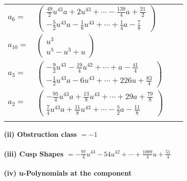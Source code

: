 \documentclass[1p]{elsarticle_modified}
\theoremstyle{definition}
\begin{document}
\begin{tabular}{m{7pt} m{180pt} m{7pt} m{180pt} }
\flushright $a_{6}=$&$\begin{pmatrix}\frac{49}{2} u^{43} a+2 u^{43}+\cdots-\frac{139}{4} a+\frac{21}{2}\\-\frac{5}{2} u^{43} a-\frac{1}{8} u^{43}+\cdots+\frac{1}{4} a-\frac{7}{8}\end{pmatrix}$ \\
\flushright $a_{10}=$&$\begin{pmatrix}u^3\\u^5- u^3+u\end{pmatrix}$ \\
\flushright $a_{3}=$&$\begin{pmatrix}-\frac{9}{2} u^{43}-\frac{19}{4} u^{42}+\cdots+a-\frac{41}{4}\\-\frac{1}{2} u^{43} a-6 u^{43}+\cdots+226 u+\frac{83}{4}\end{pmatrix}$ \\
\flushright $a_{2}=$&$\begin{pmatrix}-\frac{95}{4} u^{43} a+\frac{13}{8} u^{43}+\cdots+29 a+\frac{79}{8}\\\frac{7}{4} u^{43} a+\frac{11}{8} u^{43}+\cdots-\frac{5}{2} a-\frac{11}{8}\end{pmatrix}$\\&\end{tabular}
\flushleft \textbf{(ii) Obstruction class $= -1$}\\~\\
\flushleft \textbf{(iii) Cusp Shapes $= -\frac{97}{4} u^{43}-54 u^{42}+\cdots+\frac{1089}{4} u+\frac{51}{4}$}\\~\\
\newpage\renewcommand{\arraystretch}{1}
\flushleft \textbf{(iv) u-Polynomials at the component}\newline \\
\end{document}
